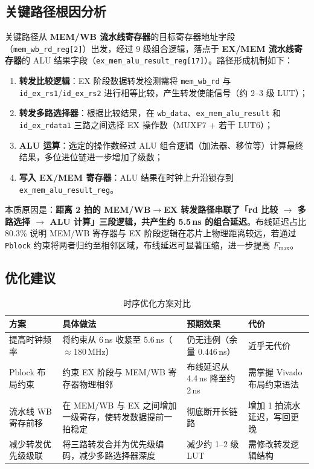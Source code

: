 \documentclass[12pt,hyperref,a4paper,UTF8]{ctexart}
\begin{document}
\subsection{关键路径根因分析}

关键路径从 \textbf{MEM/WB 流水线寄存器}的目标寄存器地址字段（\texttt{mem\_wb\_rd\_reg[2]}）出发，经过 9 级组合逻辑，落点于 \textbf{EX/MEM 流水线寄存器}的 ALU 结果字段（\texttt{ex\_mem\_alu\_result\_reg[17]}）。路径形成机制如下：

\begin{enumerate}[leftmargin=2em]
    \item \textbf{转发比较逻辑}：EX 阶段数据转发检测需将 \texttt{mem\_wb\_rd} 与 \texttt{id\_ex\_rs1}/\texttt{id\_ex\_rs2} 进行相等比较，产生转发使能信号（约 2--3 级 LUT）；
    \item \textbf{转发多路选择器}：根据比较结果，在 \texttt{wb\_data}、\texttt{ex\_mem\_alu\_result} 和 \texttt{id\_ex\_rdata1} 三路之间选择 EX 操作数（MUXF7 + 若干 LUT6）；
    \item \textbf{ALU 运算}：选定的操作数经过 ALU 组合逻辑（加法器、移位等）计算最终结果，多位进位链进一步增加了级数；
    \item \textbf{写入 EX/MEM 寄存器}：ALU 结果在时钟上升沿锁存到 \texttt{ex\_mem\_alu\_result\_reg}。
\end{enumerate}

本质原因是：\textbf{距离 2 拍的 MEM/WB$\rightarrow$EX 转发路径串联了「rd 比较 $\rightarrow$ 多路选择 $\rightarrow$ ALU 计算」三段逻辑，共产生约 5.5\,ns 的组合延迟}。布线延迟占比 80.3\% 说明 MEM/WB 寄存器与 EX 阶段逻辑在芯片上物理距离较远，若通过 \texttt{Pblock} 约束将两者归约至相邻区域，布线延迟可显著压缩，进一步提高 $F_{\max}$。

\subsection{优化建议}

\begin{table}[H]
    \centering
    \caption{时序优化方案对比}
    \label{tab:optimizations}
    \begin{tabular}{lp{5.2cm}ll}
        \toprule
        方案 & 具体做法 & 预期效果 & 代价 \\
        \midrule
        提高时钟频率 & 将约束从 6\,ns 收紧至 5.6\,ns（$\approx$180\,MHz） & 仍无违例（余量 0.446\,ns） & 近乎无代价 \\
        Pblock 布局约束 & 约束 EX 阶段与 MEM/WB 寄存器物理相邻 & 布线延迟从 4.4\,ns 降至约 2\,ns & 需掌握 Vivado 布局约束语法 \\
        流水线 WB 寄存前移 & 在 MEM/WB 与 EX 之间增加一级寄存，使转发数据提前一拍稳定 & 彻底断开长链路 & 增加 1 拍流水延迟，写回更晚 \\
        减少转发优先级级联 & 将三路转发合并为优先级编码，减少多路选择器深度 & 减少约 1--2 级 LUT & 需修改转发逻辑结构 \\
        \bottomrule
    \end{tabular}
\end{table}
\end{document}
